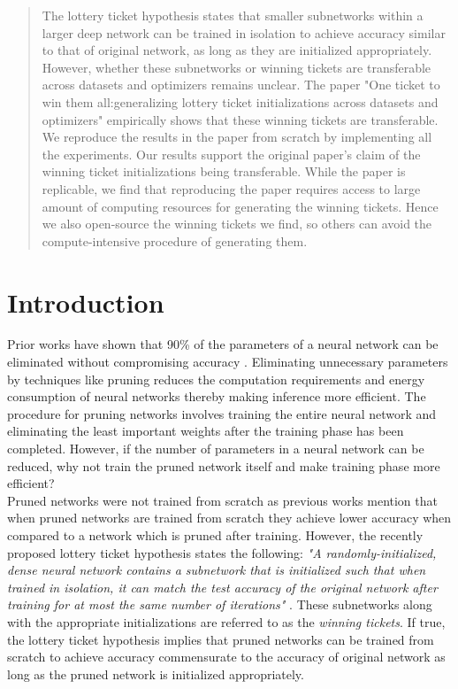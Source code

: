 \begin{abstract}
    The lottery ticket hypothesis states that smaller subnetworks within a larger deep network can be trained in isolation to achieve accuracy similar to that of original network, as long as they are initialized appropriately. However, whether these subnetworks or winning tickets are transferable across datasets and optimizers remains unclear. The paper "One ticket to win them all:generalizing lottery ticket initializations across datasets and optimizers" empirically shows that these winning tickets are transferable. We reproduce the results in the paper from scratch by implementing all the experiments. 
    Our results support the original paper's claim of the winning ticket initializations being transferable. While the paper is replicable, we find that reproducing the paper requires access to large amount of computing resources for generating the winning tickets. Hence we also open-source the winning tickets we find, so others can avoid the compute-intensive procedure of generating them.
    \end{abstract}
    
    
    \section{Introduction}
    \label{sec:intro}
    Prior works have shown that 90\% of the parameters of a neural network can be eliminated without compromising accuracy \cite{han_prune, ref2}. Eliminating unnecessary parameters by techniques like pruning reduces the computation requirements and energy consumption of neural networks thereby making inference more efficient. The procedure for pruning networks involves training the entire neural network and eliminating the least important weights after the training phase has been completed. However, if the number of parameters in a neural network can be reduced, why not train the pruned network itself and make training phase more efficient?\\
    
    Pruned networks were not trained from scratch as previous works \cite{ref2, han_prune} mention that when pruned networks are trained from scratch they achieve lower accuracy when compared to a network which is pruned after training. However, the recently proposed lottery ticket hypothesis states the following:
    \textit{"A randomly-initialized, dense neural network contains a subnetwork that is initialized such that when trained in isolation, it can match the test accuracy of the original network after training for at most the same number of iterations"} \cite{lth_orig_paper}.
    These subnetworks along with the appropriate initializations are referred to as the \textit{winning tickets}. If true, the lottery ticket hypothesis implies that pruned networks can be trained from scratch to achieve accuracy commensurate to the accuracy of original network as long as the pruned network is initialized appropriately.\\
    
